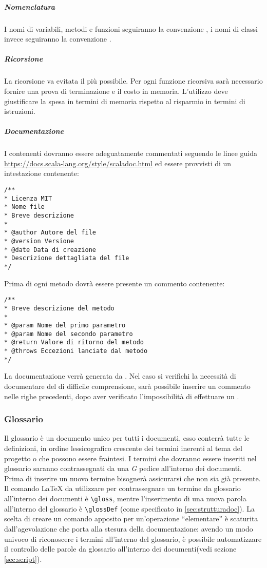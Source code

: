 \documentclass{scalatekids-article}
\begin{document}
\subparagraph{Nomenclatura}

I nomi di variabili, metodi e funzioni seguiranno la convenzione
\textit{}, i nomi di classi invece seguiranno la convenzione
\textit{}.
\subparagraph{Ricorsione}
La ricorsione va evitata il più possibile. Per ogni funzione ricorsiva sarà
necessario fornire una prova di terminazione e il costo in memoria. L'utilizzo
deve giustificare la spesa in termini di memoria rispetto al risparmio in
termini di istruzioni.

\subparagraph{Documentazione}

I  contenenti  dovranno essere adeguatamente commentati seguendo le
linee guida  \url{https://docs.scala-lang.org/style/scaladoc.html} ed essere provvisti di un
intestazione contenente:
\begin{lstlisting}
/**
* Licenza MIT
* Nome file
* Breve descrizione
*
* @author Autore del file
* @version Versione
* @date Data di creazione
* Descrizione dettagliata del file
*/
\end{lstlisting}
Prima di ogni metodo dovrà essere presente un commento  contenente:
\begin{lstlisting}
/**
* Breve descrizione del metodo
*
* @param Nome del primo parametro
* @param Nome del secondo parametro
* @return Valore di ritorno del metodo
* @throws Eccezioni lanciate dal metodo
*/
\end{lstlisting}
La documentazione verrà generata da . Nel caso si verifichi la
necessità di documentare del  di difficile comprensione, sarà possibile
inserire un commento nelle righe precedenti, dopo aver verificato
l'impossibilità di effettuare un .

\subsubsection{Glossario}

Il glossario è un documento unico per tutti i documenti, esso conterrà tutte le
definizioni, in ordine lessicografico crescente dei termini inerenti al tema
del progetto o che possono essere fraintesi. I termini che dovranno essere
inseriti nel glossario saranno contrassegnati da una \textit{G} pedice
all'interno dei documenti. Prima di inserire un nuovo termine bisognerà
assicurarsi che non sia già presente.\\ Il comando \LaTeX\xspace da utilizzare
per contrassegnare un termine da glossario all'interno dei documenti è
\verb=\gloss=, mentre l'inserimento di una nuova parola all'interno del
glossario è \verb=\glossDef= (come specificato in \ref{sec:strutturadoc}). La
scelta di creare un comando apposito per un'operazione ``elementare'' è
scaturita dall'agevolazione che porta alla stesura della documentazione: avendo
un modo univoco di riconoscere i termini all'interno del glossario, è possibile
automatizzare il controllo delle parole da glossario all'interno dei
documenti(vedi sezione \ref{sec:script}).
\end{document}
